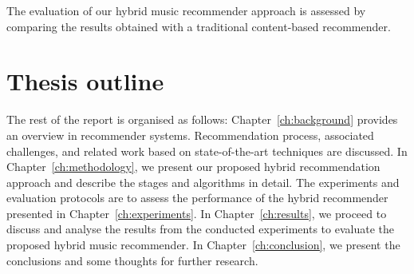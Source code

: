 The evaluation of our hybrid music recommender approach is assessed by comparing the results obtained with a traditional content-based recommender.

\section{Thesis outline}

The rest of the report is organised as follows: Chapter~\ref{ch:background} provides an overview in recommender systems. Recommendation process, associated challenges, and related work based on state-of-the-art techniques are discussed. In Chapter~\ref{ch:methodology}, we present our proposed hybrid recommendation approach and describe the stages and algorithms in detail. The experiments and evaluation protocols are to assess the performance of the hybrid recommender presented in Chapter~\ref{ch:experiments}. In Chapter~\ref{ch:results}, we proceed to discuss and analyse the results from the conducted experiments to evaluate the proposed hybrid music recommender. In Chapter~\ref{ch:conclusion}, we present the conclusions and some thoughts for further research.